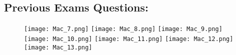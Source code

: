 \documentclass[../resumosRCOM.tex]{subfiles}
\begin{document}
\subsection{Previous Exams Questions:}
\begin{figure}[H]
    \centering
    \texttt{[image: Mac\_7.png]}
    \newline
    \newline
    \texttt{[image: Mac\_8.png]}
    \newline
    \newline
    \texttt{[image: Mac\_9.png]}
    \newline
    \newline
    \texttt{[image: Mac\_10.png]}
    \newline
    \newline
    \texttt{[image: Mac\_11.png]}
    \newline
    \newline
    \texttt{[image: Mac\_12.png]}
    \newline
    \newline
    \texttt{[image: Mac\_13.png]}
\end{figure}
\end{document}
